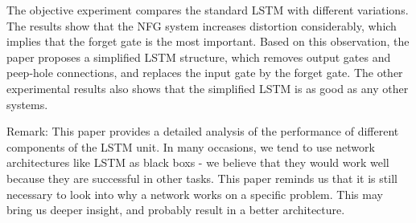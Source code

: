 The objective experiment compares the standard LSTM with different variations. The results show that the NFG system increases distortion considerably, which implies that the forget gate is the most important. Based on this observation, the paper proposes a simplified LSTM structure, which removes output gates and peep-hole connections, and replaces the input gate by the forget gate. The other experimental results also shows that the simplified LSTM is as good as any other systems.

Remark: This paper provides a detailed analysis of the performance of different components of the LSTM unit. In many occasions, we tend to use network architectures like LSTM as black boxs - we believe that they would work well because they are successful in other tasks. This paper reminds us that it is still necessary to look into why a network works on a specific problem. This may bring us deeper insight, and probably result in a better architecture. 